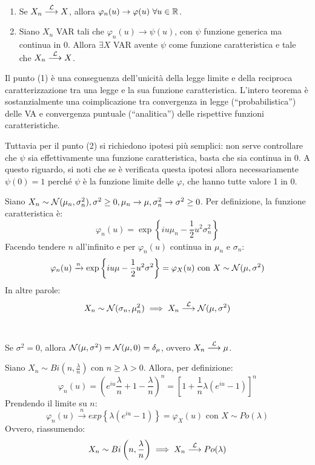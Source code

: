 \begin{teo}
  \Fixvmode
  \begin{enumerate}
    \item Se $X_n \stackrel{\mathcal L}{\longrightarrow} X$, allora $\varphi_n(u) \to \varphi(u) \ \forall u \in \mathbb R$.
    \item Siano $X_n$ VAR tali che $\varphi_n(u) \to \psi(u)$, con $\psi$ funzione generica ma continua in $0$.
    Allora $\exists X$ VAR avente $\psi$ come funzione caratteristica e tale che $X_n \stackrel{\mathcal L}{\longrightarrow} X$.
  \end{enumerate}
\end{teo}
Il punto (1) è una conseguenza dell'unicità della legge limite e della reciproca caratterizzazione tra una legge e la sua funzione caratteristica. L'intero teorema è sostanzialmente una coimplicazione tra convergenza in legge (``probabilistica'') delle VA e convergenza puntuale (``analitica'') delle rispettive funzioni caratteristiche.

Tuttavia per il punto (2) si richiedono ipotesi più semplici: non serve controllare che $\psi$ sia effettivamente una funzione caratteristica, basta che sia continua in 0.
A questo riguardo, si noti che se è verificata questa ipotesi allora necessariamente $\psi(0) = 1$ perché $\psi$ è la funzione limite delle $\varphi$, che hanno tutte valore 1 in 0.

\medskip
\begin{ese}
  Siano $X_n \sim \mathcal N(\mu_n,\sigma_n^2),
  \sigma^2 \geq 0, \mu_n \to \mu, \sigma_n^2 \to \sigma^2 \geq 0$.
  Per definizione, la funzione caratteristica è:
  $$ \varphi_n(u) = \exp\left\{ iu\mu_n - \frac 1 2 u^2 \sigma_n^2 \right\}$$
  Facendo tendere $n$ all'infinito e per $\varphi_n(u)$ continua in $\mu_n$ e $\sigma_n$:
  $$\varphi_n(u) \xrightarrow{n} \exp\left\{ iu\mu - \frac 1 2 u^2 \sigma^2 \right\} = \varphi_X(u) \text{ con } X \sim \mathcal N(\mu,\sigma^2)$$
  In altre parole:
  $$X_n \sim \mathcal N(\sigma_n, \mu_n^2) \implies X_n \stackrel{\mathcal L}{\longrightarrow} \mathcal N(\mu,\sigma^2)$$ \\
\end{ese}
\begin{nb}
  Se $\sigma^2 = 0$, allora $\mathcal N(\mu,\sigma^2) = \mathcal N(\mu,0) = \delta_\mu$, ovvero $X_n \stackrel{\mathcal L}{\longrightarrow} \mu$.
\end{nb}

\medskip
\begin{ese}
  Siano $X_n \sim Bi\left(n, \frac \lambda n\right)$ con $n \geq \lambda > 0$. Allora, per definizione:
  $$\varphi_n(u) = \left( e^{iu} \frac \lambda n + 1 - \frac \lambda n \right)^n = \left[ 1 + \frac 1 n \lambda \left(e^{iu}-1\right) \right]^n$$
  Prendendo il limite su $n$:
  $$\varphi_n(u) \stackrel{n}{\longrightarrow} exp \left\{ \lambda (e^{iu}-1) \right\} =
  \varphi_X(u) \text{ con } X \sim Po(\lambda)$$
  Ovvero, riassumendo: $$X_n \sim Bi\left(n, \frac \lambda n\right) \implies X_n \stackrel{\mathcal L}{\longrightarrow} Po(\lambda)$$
\end{ese}

